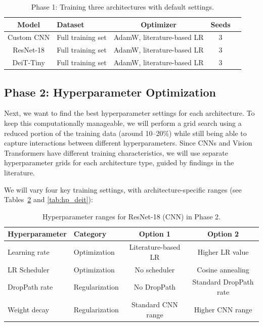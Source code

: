 \documentclass[12pt,a4paper]{article}
\begin{document}
\begin{table}[H]
\centering
\caption{Phase 1: Training three architectures with default settings.}
\label{tab:phase1}
\begin{tabular}{@{}clccc@{}}
\toprule
\textbf{Model} & \textbf{Dataset} & \textbf{Optimizer} & \textbf{Seeds} \\
\midrule
Custom CNN & Full training set & AdamW, literature-based LR & 3 \\
ResNet-18  & Full training set & AdamW, literature-based LR & 3 \\
DeiT-Tiny  & Full training set & AdamW, literature-based LR & 3 \\
\bottomrule
\end{tabular}
\end{table}

\subsection{Phase 2: Hyperparameter Optimization}

Next, we want to find the best hyperparameter settings for each architecture. To keep this computationally manageable, we will perform a grid search using a reduced portion of the training data (around 10--20\%) while still being able to capture interactions between different hyperparameters. Since CNNs and Vision Transformers have different training characteristics, we will use separate hyperparameter grids for each architecture type, guided by findings in the literature.

We will vary four key training settings, with architecture-specific ranges (see Tables~\ref{tab:hp_resnet} and \ref{tab:hp_deit}):

\begin{table}[H]
\centering
\caption{Hyperparameter ranges for ResNet-18 (CNN) in Phase 2.}
\label{tab:hp_resnet}
\begin{tabular}{@{}llcc@{}}
\toprule
\textbf{Hyperparameter} & \textbf{Category} & \textbf{Option 1} & \textbf{Option 2} \\
\midrule
Learning rate & Optimization & Literature-based LR & Higher LR value \\
LR Scheduler & Optimization & No scheduler & Cosine annealing \\
DropPath rate & Regularization & No DropPath & Standard DropPath rate \\
Weight decay & Regularization & Standard CNN range & Higher CNN range \\
\bottomrule
\end{tabular}
\end{table}
\end{document}
